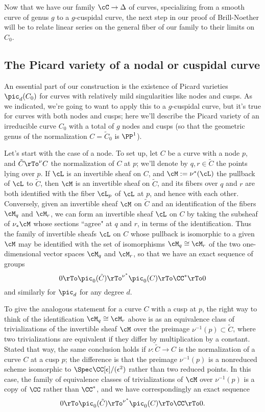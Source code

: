 Now that we have our family $\cC \to \Delta$ of curves, specializing from a smooth curve of genus $g$ to a $g$-cuspidal curve, the next step in our proof of Brill-Noether will be to relate linear series on the general fiber of our family to their limits on $C_0$.

\subsection{The Picard variety of a nodal or cuspidal curve}

An essential part of our construction is the existence of Picard varieties $\pic_d(C_0)$ for curves with relatively mild singularities like nodes and cusps. As we indicated, we're going to want to apply this to a $g$-cuspidal curve, but it's true for curves with both nodes and cusps; here we'll describe the Picard variety of an irreducible curve $C_0$ with a total of $g$ nodes and cusps (so that the geometric genus of the normalization $C = \tilde C_0$ is $\PP^1$).

Let's start with the case of a node. To set up, let $C$ be a curve with a node $p$, and $\tilde C \rTo^\nu C$ the normalization of $C$ at $p$; we'll denote by $q,r \in \tilde C$ the points lying over $p$. If $\cL$ is an invertible sheaf on $C$, and $\cM := \nu^*(\cL)$ the pullback of $\cL$ to $\tilde C$, then $\cM$ is an invertible sheaf on $\tilde C$, and its fibers over $q$ and $r$ are both identified with the fiber $\cL_p$ of $\cL$ at $p$, and hence with each other. Conversely, given an invertible sheaf $\cM$ on $\tilde C$ and an identification of the fibers $\cM_q$ and $\cM_r$, we can form an invertible sheaf $\cL$ on $C$ by taking the subsheaf of $\nu_*\cM$ whose sections ``agree" at $q$ and $r$, in terms of the identification. Thus the family of invertible sheafs $\cL$ on $C$ whose pullback is isomorphic to a given $\cM$ may be identified with the set of isomorphisms $\cM_q \cong \cM_r$ of the two one-dimensional vector spaces $\cM_q$ and $\cM_r$, so that  we have an exact sequence of groups
$$
0 \rTo \pic_0(\tilde C) \rTo^{\nu^*} \pic_0(C) \rTo \CC^* \rTo 0
$$
and similarly for $\pic_d$ for any degree $d$.

To give the analogous statement for a curve $C$ with a cusp at $p$, the right way to think of the identification $\cM_q \cong \cM_r$ above is as an equivalence class of trivializations of the invertible sheaf $\cM$ over the preimage $\nu^{-1}(p) \subset \tilde C$, where two trivializations are equivalent if they differ by multiplication by a constant. Stated that way, the same conclusion holds if $\nu : \tilde C \to C$ is the normalization of a curve $C$ at a cusp $p$; the difference is that the preimage $\nu^{-1}(p)$ is a nonreduced scheme isomorphic to $\Spec \CC[\epsilon]/(\epsilon^2)$ rather than two reduced points. In this case, the family of equivalence classes of trivializations of $\cM$ over $\nu^{-1}(p)$ is a copy of $\CC$ rather than $\CC^*$, and we have correspondingly an exact sequence 
$$
0 \rTo \pic_0(\tilde C) \rTo^{\nu^*} \pic_0(C) \rTo \CC \rTo 0.
$$

